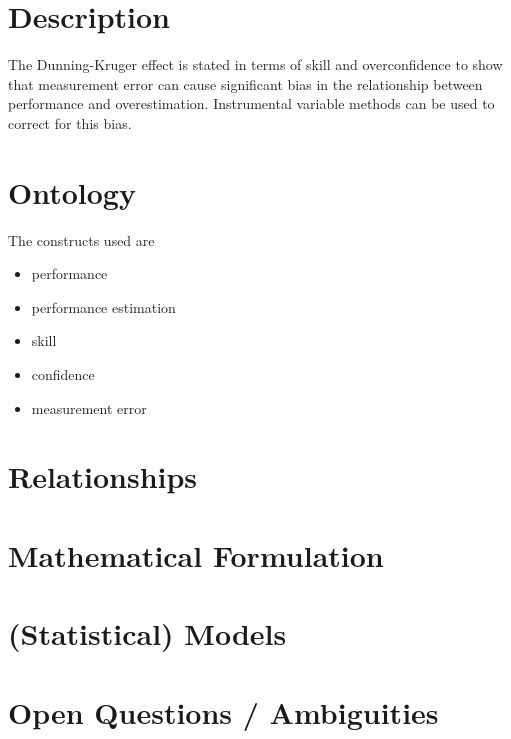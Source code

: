\documentclass[a4paper,11pt]{article}
\newcommand{\1}{\mathbf{1}}
\begin{document}
\section{Description}
The Dunning-Kruger effect is stated in terms of skill and overconfidence to show that measurement error can cause significant bias in the relationship between performance and overestimation.
Instrumental variable methods can be used to correct for this bias.

\section{Ontology}
The constructs used are
\begin{itemize}
 \item performance
 \item performance estimation
 \item skill
 \item confidence
 \item measurement error
\end{itemize}

\section{Relationships}

\section{Mathematical Formulation}

\section{(Statistical) Models}

\section{Open Questions / Ambiguities}
\end{document}
